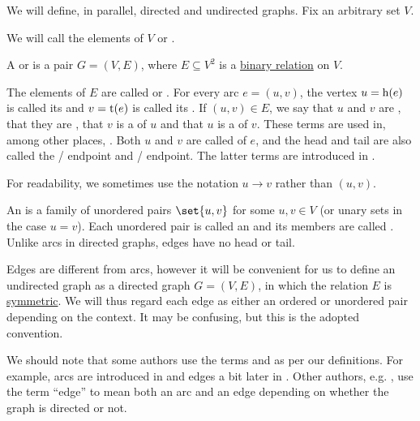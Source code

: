 \begin{definition}\label{def:graph}
  We will define, in parallel, directed and undirected graphs. Fix an arbitrary set \( V \).

  \begin{thmenum}[series=def:graph]
     We will call the elements of \( V \)  or .

     A  or  is a pair \( G = (V, E) \), where \( E \subseteq V^2 \) is a \hyperref[def:binary_relation]{binary relation} on \( V \).

    The elements of \( E \) are called  or . For every arc \( e = (u, v) \), the vertex \( u = \operatorname{h}(e) \) is called its  and \( v = \operatorname{t}(e) \) is called its . If \( (u, v) \in E \), we say that \( u \) and \( v \) are , that they are , that \( v \) is a  of \( u \) and that \( u \) is a  of \( v \). These terms are used in, among other places, \cite[sec. 5.2]{Erickson2019}. Both \( u \) and \( v \) are called  of \( e \), and the head and tail are also called the / endpoint and / endpoint. The latter terms are introduced in \cite[ch. 1, sec. 1.1]{GondranMinoux1984Graphs}.

    For readability, we sometimes use the notation \( u \to v \) rather than \( (u, v) \).

     An  is a family of unordered pairs \( \set{ u, v } \) for some \( u, v \in V \) (or unary sets in the case \( u = v \)). Each unordered pair is called an  and its members are called . Unlike arcs in directed graphs, edges have no head or tail.

    Edges are different from arcs, however it will be convenient for us to define an undirected graph as a directed graph \( G = (V, E) \), in which the relation \( E \) is \hyperref[def:binary_relation/symmetric]{symmetric}. We will thus regard each edge as either an ordered or unordered pair depending on the context. It may be confusing, but this is the adopted convention.

    We should note that some authors use the terms  and  as per our definitions. For example, arcs are introduced in \cite[ch. 1, sec. 1.1]{GondranMinoux1984Graphs} and edges a bit later in \cite[ch. 1, sec. 1.3]{GondranMinoux1984Graphs}. Other authors, e.g. \cite[sec. 5.2]{Erickson2019}, use the term \enquote{edge} to mean both an arc and an edge depending on whether the graph is directed or not.


\end{thmenum}
\end{definition}
